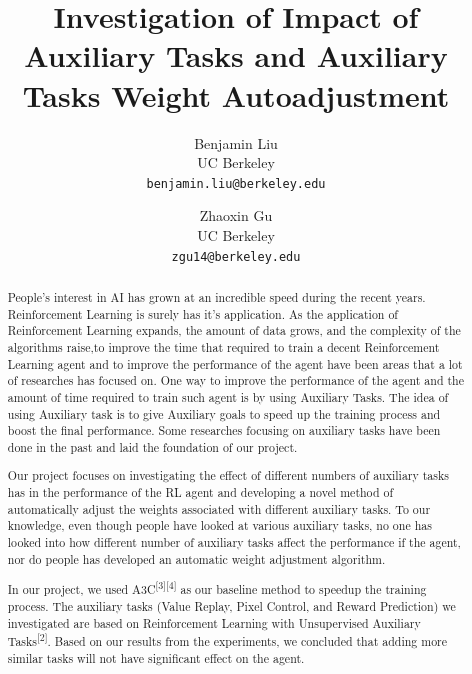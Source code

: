 \documentclass[12pt,twocolumn,letterpaper]{article}
\begin{document}
\title{Investigation of Impact of Auxiliary Tasks and Auxiliary Tasks Weight Autoadjustment}

\author{Benjamin Liu\\
UC Berkeley\\
{\tt\small benjamin.liu@berkeley.edu}
\and
Zhaoxin Gu\\
UC Berkeley\\
{\tt\small zgu14@berkeley.edu}
}

\maketitle

\begin{abstract}
	People’s interest in AI has grown at an incredible speed during the recent years. Reinforcement Learning is surely has it’s application. As the application of Reinforcement Learning expands, the amount of data grows, and the complexity of the algorithms raise,to improve the time that required to train a decent Reinforcement Learning agent and to improve the performance of the agent have been areas that a lot of researches has focused on. One way to improve the performance of the agent and the amount of time required to train such agent is by using Auxiliary Tasks. The idea of using Auxiliary task is to give Auxiliary goals to speed up the training process and boost the final performance. Some researches focusing on auxiliary tasks have been done in the past and laid the foundation of our project. 

Our project focuses on investigating the effect of different numbers of auxiliary tasks has in the performance of the RL agent and developing a novel method of automatically adjust the weights associated with different auxiliary tasks. To our knowledge, even though people have looked at various auxiliary tasks, no one has looked into how different number of auxiliary tasks affect the performance if the agent, nor do people has developed an automatic weight adjustment algorithm. 

In our project, we used A3C\textsuperscript{[3][4]} as our baseline method to speedup the training process. The auxiliary tasks (Value Replay, Pixel Control, and Reward Prediction) we investigated are based on Reinforcement Learning with Unsupervised Auxiliary Tasks\textsuperscript{[2]}. Based on our results from the experiments, we concluded that adding more similar tasks will not have significant effect on the agent. 


\end{abstract}
\end{document}
